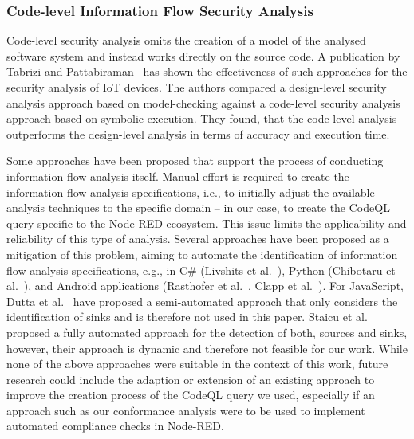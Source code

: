 \subsubsection{Code-level Information Flow Security Analysis}
Code-level security analysis omits the creation of a model of the analysed software system and instead works directly on the source code.
A publication by Tabrizi and Pattabiraman~\cite{Tabrizi19_iot_analysis} has shown the effectiveness of such approaches for the security analysis of IoT devices.
The authors compared a design-level security analysis approach based on model-checking against a code-level security analysis approach based on symbolic execution. 
They found, that the code-level analysis outperforms the design-level analysis in terms of accuracy and execution time.


Some approaches have been proposed that support the process of conducting information flow analysis itself.
Manual effort is required to create the information flow analysis specifications, i.e., to initially adjust the available analysis techniques to the specific domain -- in our case, to create the CodeQL query specific to the Node-RED ecosystem.
This issue limits the applicability and reliability of this type of analysis. 
Several approaches have been proposed as a mitigation of this problem, aiming to automate the identification of information flow analysis specifications, e.g., in C\# (Livshits et al.~\cite{Livshits09_merlin_specification_inference}), Python (Chibotaru et al.~\cite{Chibotaru19_taint_specification_learning}), and Android applications (Rasthofer et al.~\cite{Rasthofer14_android_sources_sinks}, Clapp et al.~\cite{Clapp15_mining_information_flow_specifications}).
For JavaScript, Dutta et al.~\cite{dutta2021inspectjs} have proposed a semi-automated approach that only considers the identification of sinks and is therefore not used in this paper.
Staicu et al.~\cite{Staicu20_taint_specifications} proposed a fully automated approach for the detection of both, sources and sinks, however, their approach is dynamic and therefore not feasible for our work.
While none of the above approaches were suitable in the context of this work, future research could include the adaption or extension of an existing approach to improve the creation process of the CodeQL query we used, especially if an approach such as our conformance analysis were to be used to implement automated compliance checks in Node-RED.




